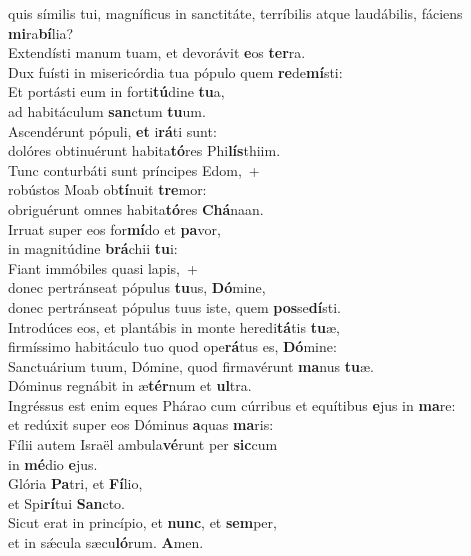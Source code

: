\evenverse quis símilis tui, magníficus in sanctitáte, terríbilis atque laudábilis, fáciens \textbf{mi}ra\textbf{bí}lia?\\
\oddverse Extendísti manum tuam, et devorávit \textbf{e}os \textbf{ter}ra.~\*\\
\oddverse Dux fuísti in misericórdia tua pópulo quem \textbf{re}de\textbf{mí}sti:\\
\evenverse Et portásti eum in forti\textbf{tú}dine \textbf{tu}a,~\*\\
\evenverse ad habitáculum \textbf{san}ctum \textbf{tu}um.\\
\oddverse Ascendérunt pópuli, \textbf{et} i\textbf{rá}ti sunt:~\*\\
\oddverse dolóres obtinuérunt habita\textbf{tó}res Phi\textbf{lís}thiim.\\
\evenverse Tunc conturbáti sunt príncipes Edom,~+\\
\evenverse  robústos Moab ob\textbf{tí}nuit \textbf{tre}mor:~\*\\
\evenverse obriguérunt omnes habita\textbf{tó}res \textbf{Chá}naan.\\
\oddverse Irruat super eos for\textbf{mí}do et \textbf{pa}vor,~\*\\
\oddverse in magnitúdine \textbf{brá}chii \textbf{tu}i:\\
\evenverse Fiant immóbiles quasi lapis,~+\\
\evenverse  donec pertránseat pópulus \textbf{tu}us, \textbf{Dó}mine,~\*\\
\evenverse donec pertránseat pópulus tuus iste, quem \textbf{pos}se\textbf{dí}sti.\\
\oddverse Introdúces eos, et plantábis in monte heredi\textbf{tá}tis \textbf{tu}æ,~\*\\
\oddverse firmíssimo habitáculo tuo quod ope\textbf{rá}tus es, \textbf{Dó}mine:\\
\evenverse Sanctuárium tuum, Dómine, quod firmavérunt \textbf{ma}nus \textbf{tu}æ.~\*\\
\evenverse Dóminus regnábit in æ\textbf{tér}num et \textbf{ul}tra.\\
\oddverse Ingréssus est enim eques Phárao cum cúrribus et equítibus \textbf{e}jus in \textbf{ma}re:~\*\\
\oddverse et redúxit super eos Dóminus \textbf{a}quas \textbf{ma}ris:\\
\evenverse Fílii autem Israël ambula\textbf{vé}runt per \textbf{sic}cum~\*\\
\evenverse in \textbf{mé}dio \textbf{e}jus.\\
\oddverse Glória \textbf{Pa}tri, et \textbf{Fí}lio,~\*\\
\oddverse et Spi\textbf{rí}tui \textbf{San}cto.\\
\evenverse Sicut erat in princípio, et \textbf{nunc}, et \textbf{sem}per,~\*\\
\evenverse et in sǽcula sæcu\textbf{ló}rum. \textbf{A}men.\\
